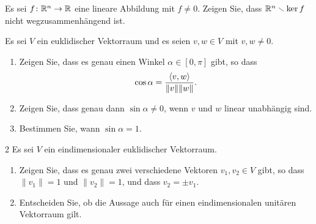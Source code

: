 






\begin{question}[subtitle = Zerschneidung von $\Rbb^n$]{2}
  Es sei $f \colon \mathbb{R}^n \to \mathbb{R}$ eine lineare Abbildung mit $f \neq 0$.
  Zeigen Sie, dass $\mathbb{R}^n \smallsetminus \ker f$ nicht wegzusammenhängend ist.
\end{question}


\begin{question}[subtitle = Definition und Sinus des unorientierten Winkels]{2}
  Es sei $V$ ein euklidischer Vektorraum und es seien $v, w \in V$ mit $v, w \neq 0$.
  \begin{enumerate}[leftmargin=*]
    \item
      Zeigen Sie, dass es genau einen Winkel $\alpha \in [0,\pi]$ gibt, so dass
      \[
          \cos \alpha
        = \frac{\left\langle v, w \right\rangle}{\|v\| \|w\|}.
      \]
    \item
      Zeigen Sie, dass genau dann $\sin \alpha \neq 0$, wenn $v$ und $w$ linear unabhängig sind.
    \item
      Bestimmen Sie, wann $\sin \alpha = 1$.
  \end{enumerate}
\end{question}


\begin{question}[subtitle = Zur Existenz und Eindeutigkeit normierter Vektoren auf der Gerade]{2}
  Es sei $V$ ein eindimensionaler euklidischer Vektorraum.
  \begin{enumerate}[leftmargin=*]
    \item
      Zeigen Sie, dass es genau zwei verschiedene Vektoren $v_1, v_2 \in V$ gibt, so dass $\|v_1\| = 1$ und $\|v_2\| = 1$, und dass $v_2 = \pm v_1$.
    \item
      Entscheiden Sie, ob die Aussage auch für einen eindimensionalen unitären Vektorraum gilt.
  \end{enumerate}
\end{question}


